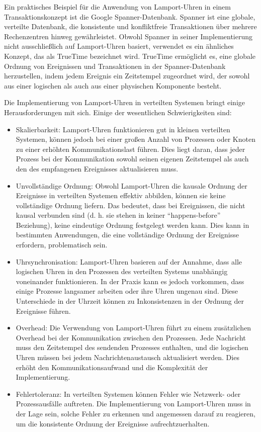 Ein praktisches Beispiel für die Anwendung von Lamport-Uhren in einem Transaktionskonzept ist die Google Spanner-Datenbank. Spanner ist eine globale, verteilte Datenbank, die konsistente und konfliktfreie Transaktionen über mehrere Rechenzentren hinweg gewährleistet. Obwohl Spanner in seiner Implementierung nicht ausschließlich auf Lamport-Uhren basiert, verwendet es ein ähnliches Konzept, das als TrueTime bezeichnet wird. TrueTime ermöglicht es, eine globale Ordnung von Ereignissen und Transaktionen in der Spanner-Datenbank herzustellen, indem jedem Ereignis ein Zeitstempel zugeordnet wird, der sowohl aus einer logischen als auch aus einer physischen Komponente besteht.

Die Implementierung von Lamport-Uhren in verteilten Systemen bringt einige Herausforderungen mit sich. Einige der wesentlichen Schwierigkeiten sind:
\begin{itemize}
\item Skalierbarkeit: Lamport-Uhren funktionieren gut in kleinen verteilten Systemen, können jedoch bei einer großen Anzahl von Prozessen oder Knoten zu einer erhöhten Kommunikationslast führen. Dies liegt daran, dass jeder Prozess bei der Kommunikation sowohl seinen eigenen Zeitstempel als auch den des empfangenen Ereignisses aktualisieren muss.
\item Unvollständige Ordnung: Obwohl Lamport-Uhren die kausale Ordnung der Ereignisse in verteilten Systemen effektiv abbilden, können sie keine vollständige Ordnung liefern. Das bedeutet, dass bei Ereignissen, die nicht kausal verbunden sind (d. h. sie stehen in keiner \enquote{happens-before} Beziehung), keine eindeutige Ordnung festgelegt werden kann. Dies kann in bestimmten Anwendungen, die eine vollständige Ordnung der Ereignisse erfordern, problematisch sein.
\item Uhrsynchronisation: Lamport-Uhren basieren auf der Annahme, dass alle logischen Uhren in den Prozessen des verteilten Systems unabhängig voneinander funktionieren. In der Praxis kann es jedoch vorkommen, dass einige Prozesse langsamer arbeiten oder ihre Uhren ungenau sind. Diese Unterschiede in der Uhrzeit können zu Inkonsistenzen in der Ordnung der Ereignisse führen.
\item Overhead: Die Verwendung von Lamport-Uhren führt zu einem zusätzlichen Overhead bei der Kommunikation zwischen den Prozessen. Jede Nachricht muss den Zeitstempel des sendenden Prozesses enthalten, und die logischen Uhren müssen bei jedem Nachrichtenaustausch aktualisiert werden. Dies erhöht den Kommunikationsaufwand und die Komplexität der Implementierung.
\item Fehlertoleranz: In verteilten Systemen können Fehler wie Netzwerk- oder Prozessausfälle auftreten. Die Implementierung von Lamport-Uhren muss in der Lage sein, solche Fehler zu erkennen und angemessen darauf zu reagieren, um die konsistente Ordnung der Ereignisse aufrechtzuerhalten.
\end{itemize}
